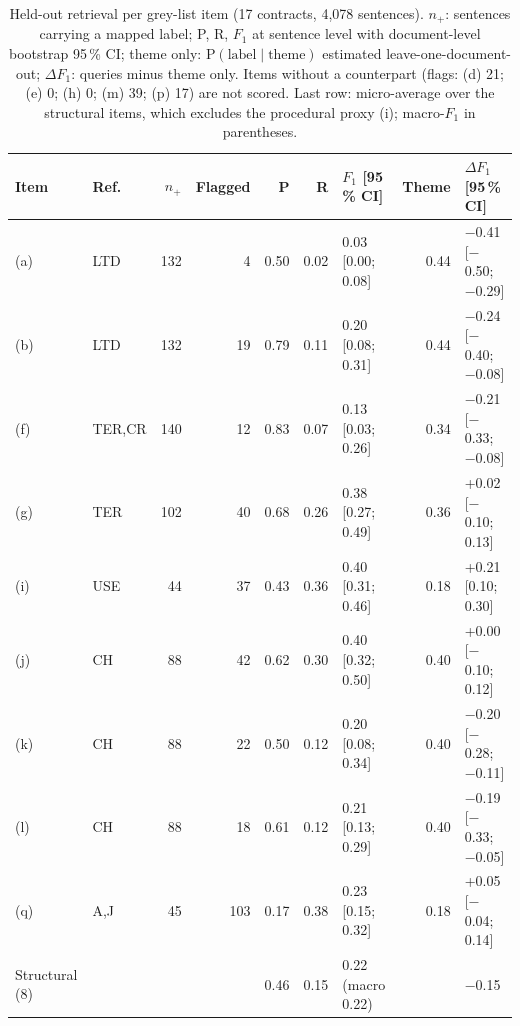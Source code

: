 \begin{table}[t]
\caption{Held-out retrieval per grey-list item (17 contracts, 4,078 sentences). $n_+$: sentences carrying a mapped \corpus{} label; P, R, $F_1$ at sentence level with document-level bootstrap 95\,\% CI; theme only: $\mathrm{P}(\text{label} \mid \text{theme})$ estimated leave-one-document-out; $\Delta F_1$: queries minus theme only. Items without a \corpus{} counterpart (flags: (d) 21; (e) 0; (h) 0; (m) 39; (p) 17) are not scored. Last row: micro-average over the structural items, which excludes the procedural proxy (i); macro-$F_1$ in parentheses.}
\label{tab:queries}
\centering
\footnotesize\setlength{\tabcolsep}{2.1pt}%
\begin{tabular}{@{}llrrrrlrl@{}}
\toprule
Item & Ref. & $n_+$ & Flagged & P & R & $F_1$ [95\,\% CI] & Theme & $\Delta F_1$ [95\,\% CI] \\
\midrule
(a) & LTD & 132 & 4 & 0.50 & 0.02 & 0.03 [0.00; 0.08] & 0.44 & $-$0.41 [$-$0.50; $-$0.29] \\
(b) & LTD & 132 & 19 & 0.79 & 0.11 & 0.20 [0.08; 0.31] & 0.44 & $-$0.24 [$-$0.40; $-$0.08] \\
(f) & TER,CR & 140 & 12 & 0.83 & 0.07 & 0.13 [0.03; 0.26] & 0.34 & $-$0.21 [$-$0.33; $-$0.08] \\
(g) & TER & 102 & 40 & 0.68 & 0.26 & 0.38 [0.27; 0.49] & 0.36 & +0.02 [$-$0.10; 0.13] \\
(i) & USE & 44 & 37 & 0.43 & 0.36 & 0.40 [0.31; 0.46] & 0.18 & +0.21 [0.10; 0.30] \\
(j) & CH & 88 & 42 & 0.62 & 0.30 & 0.40 [0.32; 0.50] & 0.40 & +0.00 [$-$0.10; 0.12] \\
(k) & CH & 88 & 22 & 0.50 & 0.12 & 0.20 [0.08; 0.34] & 0.40 & $-$0.20 [$-$0.28; $-$0.11] \\
(l) & CH & 88 & 18 & 0.61 & 0.12 & 0.21 [0.13; 0.29] & 0.40 & $-$0.19 [$-$0.33; $-$0.05] \\
(q) & A,J & 45 & 103 & 0.17 & 0.38 & 0.23 [0.15; 0.32] & 0.18 & +0.05 [$-$0.04; 0.14] \\
\midrule
Structural (8) & & & & 0.46 & 0.15 & 0.22 (macro 0.22) & & $-$0.15 \\
\bottomrule
\end{tabular}
\end{table}
